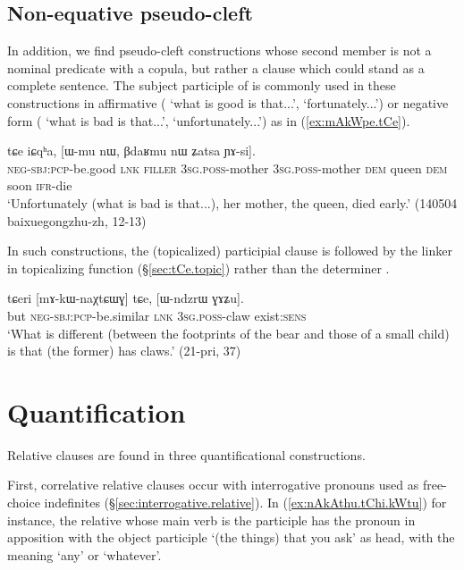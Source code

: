 \subsection{Non-equative pseudo-cleft} \label{sec:pseudo.cleft2}
In addition, we find pseudo-cleft constructions whose second member is not a nominal predicate with a copula, but rather a clause which could stand as a complete sentence. The subject participle of  is commonly used in these constructions in affirmative ( `what is good is that...', `fortunately...') or negative form ( `what is bad is that...', `unfortunately...') as in (\ref{ex:mAkWpe.tCe}).

\begin{exe}
\ex \label{ex:mAkWpe.tCe}
\gll   [mɤ-kɯ-pe] tɕe iɕqʰa, [ɯ-mu nɯ, βdaʁmu nɯ ʑatsa ɲɤ-si].\\
\textsc{neg}-\textsc{sbj}:\textsc{pcp}-be.good \textsc{lnk} \textsc{filler} \textsc{3sg}.\textsc{poss}-mother  \textsc{3sg}.\textsc{poss}-mother \textsc{dem} queen \textsc{dem} soon \textsc{ifr}-die \\
\glt `Unfortunately (what is bad is that...), her mother, the queen, died early.' (140504 baixuegongzhu-zh, 12-13)
\end{exe}

In such constructions, the (topicalized) participial clause is followed by the linker  in topicalizing function (§\ref{sec:tCe.topic}) rather than the determiner .

\begin{exe}
\ex \label{ex:mAkWnaXtCWG.tCe}
\gll tɕeri [mɤ-kɯ-naχtɕɯɣ] tɕe, [ɯ-ndzrɯ ɣɤʑu].  \\
but \textsc{neg}-\textsc{sbj}:\textsc{pcp}-be.similar \textsc{lnk} \textsc{3sg}.\textsc{poss}-claw exist:\textsc{sens} \\
\glt `What is different (between the footprints of the bear and those of a small child) is that (the former) has claws.' (21-pri, 37)
\end{exe}

 
\section{Quantification} \label{sec:headless.relatives.quantification}
Relative clauses are found in three quantificational constructions. 

First, correlative relative clauses occur with interrogative pronouns used as free-choice indefinites (§\ref{sec:interrogative.relative}). In (\ref{ex:nAkAthu.tChi.kWtu}) for instance, the relative whose main verb is the participle  has the pronoun  in apposition with the object participle  `(the things) that you ask' as head, with the meaning `any' or `whatever'.

